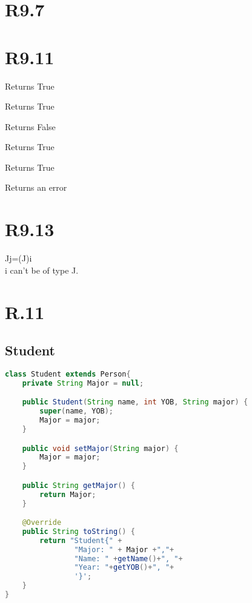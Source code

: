 \documentclass{article}
\begin{document}
\section{R9.7}
\section{R9.11}
\begin{alphalist}
 \item Returns True
 \item Returns True
 \item Returns False
 \item Returns True
 \item Returns True
 \item Returns an error
\end{alphalist}
\section{R9.13}
Jj=(J)i\\
i can't be of type J.
\newpage
\section{R.11}
\subsection*{Student}
\begin{lstlisting}[language=Java]
class Student extends Person{
    private String Major = null;

    public Student(String name, int YOB, String major) {
        super(name, YOB);
        Major = major;
    }

    public void setMajor(String major) {
        Major = major;
    }

    public String getMajor() {
        return Major;
    }

    @Override
    public String toString() {
        return "Student{" +
                "Major: " + Major +","+
                "Name: " +getName()+", "+
                "Year: "+getYOB()+", "+
                '}';
    }
}

\end{lstlisting}
\end{document}
